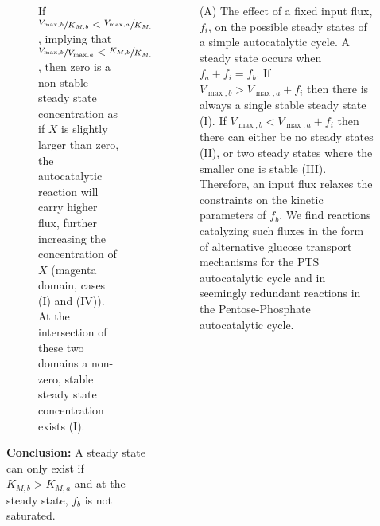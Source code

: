 \documentclass[final,10pt]{beamer}
\begin{document}
\begin{frame}{}
\begin{columns}[t]
\begin{column}{0.48\textwidth}
\begin{block}{}
\begin{figure}
{        If $\sfrac{V_{\max,b}}{K_{M,b}}<\sfrac{V_{\max,a}}{K_{M,a}}$, implying that $\sfrac{V_{\max,b}}{V_{\max,a}}<\sfrac{K_{M,b}}{K_{M,a}}$, then zero is a non-stable steady state concentration as if $X$ is slightly larger than zero, the autocatalytic reaction will carry higher flux, further increasing the concentration of $X$ (magenta domain, cases (I) and (IV)).
    At the intersection of these two domains a non-zero, stable steady state concentration exists (I).}
    \end{figure}
    \textbf{Conclusion:} A steady state can only exist if $K_{M,b}>K_{M,a}$ and at the steady state, $f_b$ is not saturated.
        \end{block}
    \end{column}
    \hspace{-.75cm}
    \vrule
    \hspace{.3cm}
    \begin{column}{0.48\textwidth}
        \begin{block}{}
            \begin{figure}
            \begin{adjustbox}{max totalsize={\textwidth}{\textheight},center}
                
            \end{adjustbox}
      \caption{\label{fig:inputcycle}
        (A) The effect of a fixed input flux, $f_i$, on the possible steady states of a simple autocatalytic cycle.
        A steady state occurs when $f_a+f_i=f_b$.
        If $V_{\max,b}>V_{\max,a}+f_i$ then there is always a single stable steady state (I).
        If $V_{\max,b}<V_{\max,a}+f_i$ then there can either be no steady states (II), or two steady states where the smaller one is stable (III).
        Therefore, an input flux relaxes the constraints on the kinetic parameters of $f_b$.
        We find reactions catalyzing such fluxes in the form of alternative glucose transport mechanisms for the PTS autocatalytic cycle and in seemingly redundant reactions in the Pentose-Phosphate autocatalytic cycle.
      }
    \end{figure}


\end{block}
\end{column}
\end{columns}
\end{frame}
\end{document}
